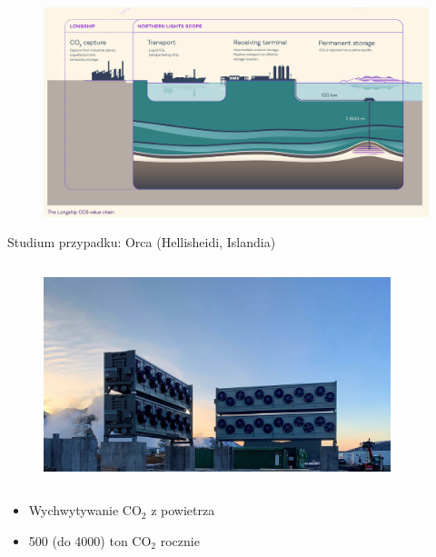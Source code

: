 \begin{frame}
    \begin{figure}
        \centering
        \includegraphics[width=1.0\textwidth, frame]{images/northern_lights_infographic.png}
    \end{figure}
\end{frame}

\begin{columnframe}{Studium przypadku: Orca (Hellisheidi, Islandia)}
    \begin{column}{0.5\textwidth}
        \begin{figure}
            \centering
            \includegraphics[width=0.9\textwidth, frame]{images/orca_iceland.jpg}
        \end{figure}
    \end{column}
    \begin{column}{0.5\textwidth}
        \begin{itemize}
            \item Wychwytywanie CO$_2$ z powietrza
            \item 500 (do 4000) ton CO$_2$ rocznie
        \end{itemize}
    \end{column}
\end{columnframe}

